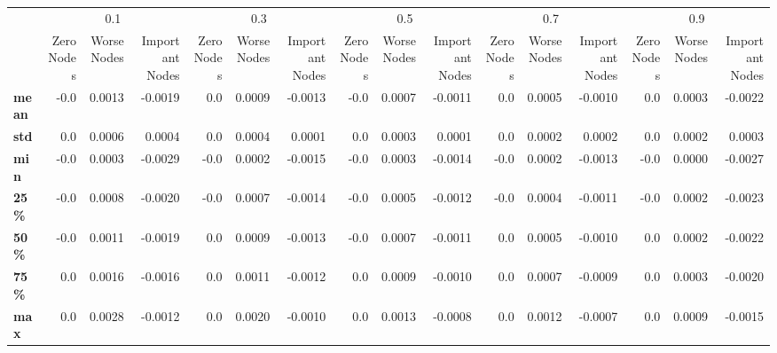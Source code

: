 \begin{tabular}{lrrrrrrrrrrrrrrr}
\toprule
{} & \multicolumn{3}{c}{0.1} & \multicolumn{3}{c}{0.3} & \multicolumn{3}{c}{0.5} & \multicolumn{3}{c}{0.7} & \multicolumn{3}{c}{0.9} \\
{} & Zero Nodes & Worse Nodes & Important Nodes & Zero Nodes & Worse Nodes & Important Nodes & Zero Nodes & Worse Nodes & Important Nodes & Zero Nodes & Worse Nodes & Important Nodes & Zero Nodes & Worse Nodes & Important Nodes \\
\midrule
\textbf{mean} &       -0.0 &      0.0013 &         -0.0019 &        0.0 &      0.0009 &         -0.0013 &       -0.0 &      0.0007 &         -0.0011 &        0.0 &      0.0005 &         -0.0010 &        0.0 &      0.0003 &         -0.0022 \\
\textbf{std } &        0.0 &      0.0006 &          0.0004 &        0.0 &      0.0004 &          0.0001 &        0.0 &      0.0003 &          0.0001 &        0.0 &      0.0002 &          0.0002 &        0.0 &      0.0002 &          0.0003 \\
\textbf{min } &       -0.0 &      0.0003 &         -0.0029 &       -0.0 &      0.0002 &         -0.0015 &       -0.0 &      0.0003 &         -0.0014 &       -0.0 &      0.0002 &         -0.0013 &       -0.0 &      0.0000 &         -0.0027 \\
\textbf{25\% } &       -0.0 &      0.0008 &         -0.0020 &       -0.0 &      0.0007 &         -0.0014 &       -0.0 &      0.0005 &         -0.0012 &       -0.0 &      0.0004 &         -0.0011 &       -0.0 &      0.0002 &         -0.0023 \\
\textbf{50\% } &       -0.0 &      0.0011 &         -0.0019 &        0.0 &      0.0009 &         -0.0013 &       -0.0 &      0.0007 &         -0.0011 &        0.0 &      0.0005 &         -0.0010 &        0.0 &      0.0002 &         -0.0022 \\
\textbf{75\% } &        0.0 &      0.0016 &         -0.0016 &        0.0 &      0.0011 &         -0.0012 &        0.0 &      0.0009 &         -0.0010 &        0.0 &      0.0007 &         -0.0009 &        0.0 &      0.0003 &         -0.0020 \\
\textbf{max } &        0.0 &      0.0028 &         -0.0012 &        0.0 &      0.0020 &         -0.0010 &        0.0 &      0.0013 &         -0.0008 &        0.0 &      0.0012 &         -0.0007 &        0.0 &      0.0009 &         -0.0015 \\
\bottomrule
\end{tabular}
